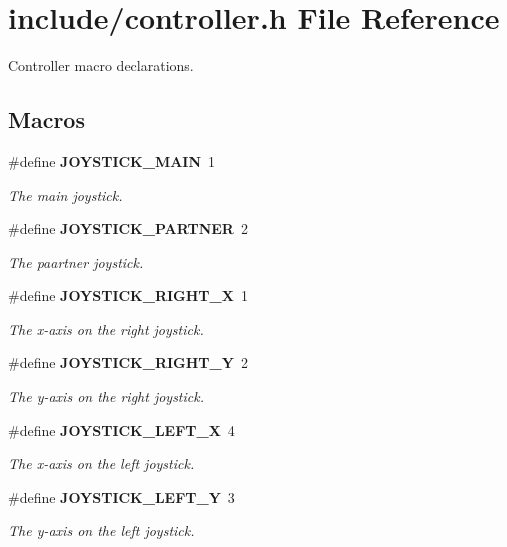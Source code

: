 \section{include/controller.h File Reference}
\label{controller_8h}


Controller macro declarations.  


\subsection*{Macros}
\begin{DoxyCompactItemize}
\item 
\#define \textbf{ J\+O\+Y\+S\+T\+I\+C\+K\+\_\+\+M\+A\+IN}~1
\begin{DoxyCompactList}\small\item\em The main joystick. \end{DoxyCompactList}\item 
\#define \textbf{ J\+O\+Y\+S\+T\+I\+C\+K\+\_\+\+P\+A\+R\+T\+N\+ER}~2
\begin{DoxyCompactList}\small\item\em The paartner joystick. \end{DoxyCompactList}\item 
\#define \textbf{ J\+O\+Y\+S\+T\+I\+C\+K\+\_\+\+R\+I\+G\+H\+T\+\_\+X}~1
\begin{DoxyCompactList}\small\item\em The x-\/axis on the right joystick. \end{DoxyCompactList}\item 
\#define \textbf{ J\+O\+Y\+S\+T\+I\+C\+K\+\_\+\+R\+I\+G\+H\+T\+\_\+Y}~2
\begin{DoxyCompactList}\small\item\em The y-\/axis on the right joystick. \end{DoxyCompactList}\item 
\#define \textbf{ J\+O\+Y\+S\+T\+I\+C\+K\+\_\+\+L\+E\+F\+T\+\_\+X}~4
\begin{DoxyCompactList}\small\item\em The x-\/axis on the left joystick. \end{DoxyCompactList}\item 
\#define \textbf{ J\+O\+Y\+S\+T\+I\+C\+K\+\_\+\+L\+E\+F\+T\+\_\+Y}~3
\begin{DoxyCompactList}\small\item\em The y-\/axis on the left joystick. \end{DoxyCompactList}\end{DoxyCompactItemize}
